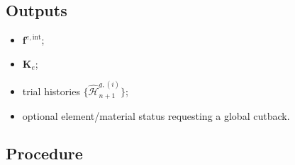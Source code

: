 \documentclass[11pt,a4paper]{article}
\newcommand{\vct}[1]{\mathbf{#1}}
\begin{document}
\subsection*{Outputs}
\begin{itemize}
    \item $\vct f^{e,\mathrm{int}}$;
    \item $\vct{K}_e$;
    \item trial histories $\{\widehat{\mathcal{H}}_{n+1}^{g,(i)}\}$;
    \item optional element/material status requesting a global cutback.
\end{itemize}

\subsection*{Procedure}
\end{document}
